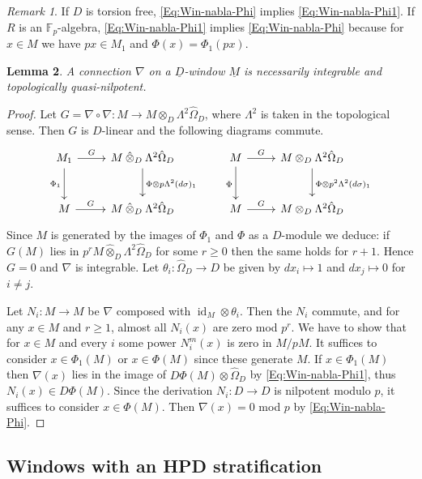 \documentclass[a4paper,11pt]{article}
\theoremstyle{plain}
\newtheorem{Lemma}{Lemma}
\theoremstyle{definition}
\theoremstyle{remark}
\newtheorem{Remark}[Lemma]{Remark}
\theoremstyle{definition}
\numberwithin{Lemma}{section}
\numberwithin{Subpoint}{Lemma}
\numberwithin{equation}{section}
\newcommand{\FF}{{\mathbb{F}}}
\newcommand{\hatotimes}{\mathbin{\hat\otimes}}
\DeclareMathOperator{\id}{id}
\renewcommand{\u}{\underline}
\newcommand{\chang}[1]{{#1}}
\begin{document}
\begin{Remark}
If $D$ is torsion free, \eqref{Eq:Win-nabla-Phi} implies
\eqref{Eq:Win-nabla-Phi1}.
If $R$ is an $\FF_p$-algebra,
\eqref{Eq:Win-nabla-Phi1} implies \eqref{Eq:Win-nabla-Phi}
because for $x\in M$ we have $px\in M_1$ and $\Phi(x)=\Phi_1(px)$.
\end{Remark}

\begin{Lemma}
A connection $\nabla$ on a $\u D$-window $\u M$ is necessarily
integrable and topologically quasi-nilpotent.
\end{Lemma}

\begin{proof}
Let $G=\nabla\circ\nabla:M\to M\otimes_D\Lambda^2\hat\Omega_D$,
where $\Lambda^2$ is taken in the topological sense.
Then $G$ is $D$-linear and the following diagrams commute.
\[
\xymatrix@M+0.2em{
 M_1 \ar[r]^-G \ar[d]_{\Phi_1} &
M\hatotimes_D\Lambda^2\hat\Omega_D 
\ar[d]^{\Phi\otimes p\Lambda^2(d\sigma)_1} \\
M \ar[r]^-G &
M\hatotimes_D\Lambda^2\hat\Omega_D
}
\qquad
\xymatrix@M+0.2em{
M \ar[r]^-G \ar[d]_{\Phi} &
M\otimes_D\Lambda^2\hat\Omega_D 
\ar[d]^{\Phi\otimes p^2\Lambda^2(d\sigma)_1} \\
M \ar[r]^-G &
M\otimes_D\Lambda^2\hat\Omega_D
}
\]
Since $M$ is generated by the images of $\Phi_1$ and $\Phi$ as a $D$-module
we deduce: if $G(M)$ lies in 
$p^rM\hatotimes_D\Lambda^2\hat\Omega_D$ for some $r\ge 0$
then the same holds for $r+1$. 
Hence $G=0$ and $\nabla$ is integrable.
Let $\theta_i:\hat\Omega_D\to D$ be given by $dx_i\mapsto 1$
and $dx_j\mapsto 0$ for $i\ne j$.

Let $N_i:M\to M$ be $\nabla$ composed with ${\id_M}\otimes\theta_i$.
Then the $N_i$ commute, and for \chang{any} $x\in M$ and $r\ge 1$,
almost all $N_i(x)$ are zero mod $p^r$.
We have to show that for $x\in M$ and \chang{every} $i$
some power $N_i^m(x)$ is zero in $M/pM$.
It suffices to consider $x\in\Phi_1(M)$ or $x\in\Phi(M)$
since these generate $M$.
If $x\in\Phi_1(M)$ then $\nabla(x)$ lies in the image of 
$D\Phi(M)\otimes\hat\Omega_D$ by \eqref{Eq:Win-nabla-Phi1},
thus $N_i(x)\in D\Phi(M)$.
Since the derivation $N_i:D\to D$ is nilpotent modulo $p$,
it suffices to consider $x\in\Phi(M)$.
Then $\nabla(x)=0$ mod $p$ by \eqref{Eq:Win-nabla-Phi}.
\end{proof}

\subsection*{Windows with an HPD stratification}
\end{document}
